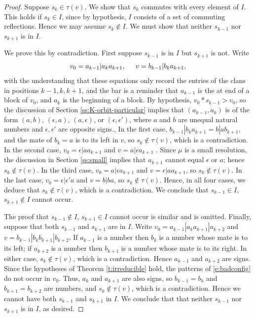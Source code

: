 \documentclass[11pt,letterpaper,reqno]{amsart}
\newcommand{\gre}{\epsilon}
\numberwithin{equation}{section}
\theoremstyle{plain}
\theoremstyle{definition}
\theoremstyle{remark}
\begin{document}
\begin{proof}
Suppose $s_{k} \in \tau(v)$.  We show that $s_{k}$ commutes
with every element of $I$.  This holds if $s_{k} \in I$, since
by hypothesis, $I$ consists of a set of commuting reflections.  Hence
we may assume $s_{k} \not\in I$.  We must show that neither $s_{{k-1}}$ nor $s_{{k+1}}$
is in $I$.  

We prove this by contradiction.  First suppose $s_{{k-1}} $ is in $I$ but $s_{{k+1}}$ is
not.  Write
$$
v_0 = a_{k-1} | a_k a_{k+1}, \hspace{.2in} v = b_{k-1} | b_k a_{k+1},
$$
with the understanding that these equations only record the entries of the clans in positions
$k-1, k, k+1$, and the bar is a reminder that $a_{k-1}$ is the at end of a block of $v_0$, 
and $a_k$ is the beginning of a block.  By hypothesis,  $v_0 * s_{{k-1}} > v_0$, so the discussion of
Section \ref{ss:K-orbit-particular} implies that  $(a_{k-1}, a_k)$ is of the form
$(a,b)$, $(\gre, a)$, $(a, \gre)$, or $(\gre, \gre')$, where $a$ and $b$ are unequal natural numbers
and $\gre, \gre'$ are opposite signs.,
In the first case, 
$b_{k-1} | b_k a_{k+1} = b | a b_{k+1}$, and
the mate of $b_k = a$ is to its left in $v$, so $s_{k} \not\in \tau(v)$, which is a contradiction.
In the second case, $v_0 = \gre | a a_{k+1}$ and $v = a | \gre a_{k+1}$ .  Since $\mu$ is a small resolution, the discussion
in Section \ref{ss:small} implies that $a_{k+1}$ cannot equal $\gre$ or $a$; hence $s_{k} \not\in \tau(v)$.
 In the third case, $v_0 = a | \gre a_{k+1}$ and $v = \gre | a a_{k+1}$, so $s_{k} \not\in \tau(v)$.
In the last case, $v_0 = \gre | \gre' a$ and $v = b | b a$, so $s_{k} \not\in \tau(v)$.  Hence, in all four cases,
we deduce that $s_{k} \not\in \tau(v)$, which is a contradiction.  We conclude that
$s_{{k-1}} \in I$, $s_{{k+1}} \not\in I$ cannot occur.

The proof that $s_{{k-1}} \not\in I$, $s_{{k+1}} \in I$ cannot occur is similar and is omitted.
Finally, suppose that both $s_{{k-1}}$ and $s_{{k+1}}$
are in $I$.   Write $v_0 = a_{k-1} | a_k a_{k+1} | a_{k+2}$ and
$v = b_{k-1} | b_k b_{k+1} | b_{k+2}$.  If $a_{k-1}$ is a number then $b_k$ is a number whose mate
is to its left; if $a_{k+2}$ is a number then $b_{k+1}$ is a number whose mate is to its right.
In either case, $s_{k} \not\in \tau(v)$, which is a contradiction.  Hence $a_{k-1}$ and $a_{k+2}$ are signs.
Since the hypotheses of Theorem \ref{t:irreducible} hold, the patterns of \eqref{e:badconfig} do not occur in $v_0$.
Thus, $a_k$ and $a_{k+1}$ are also signs, so $b_{k-1} = b_k$ and $b_{k+1} = b_{k+2}$ are numbers,
and $s_{k} \not\in \tau(v)$, which is a contradiction.  Hence we cannot have both  $s_{{k-1}}$ and $s_{{k+1}}$ in $I$.
We conclude that that neither $s_{{k-1}}$ nor $s_{{k+1}}$
is in $I$, as desired.


\end{proof}
\end{document}
